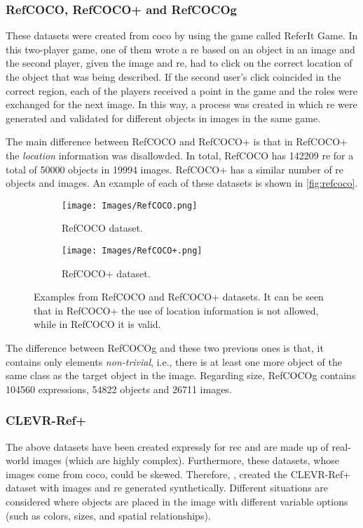 \subsubsection{RefCOCO, RefCOCO+ and RefCOCOg}
These datasets were created from \gls{coco} by 
using the game called ReferIt Game. In this two-player game, one of them wrote
a \gls{re} based on an object in an image and the second player, given the
image and \gls{re}, had to click on the correct location of the object that was
being described. If the second user's click coincided in the correct region,
each of the players received a point in the game and the roles were exchanged
for the next image. In this way, a process was created in which \gls{re} were
generated and validated for different objects in images in the same game.

The main difference between RefCOCO and RefCOCO+ is that in RefCOCO+ the
\emph{location} information was disallowded. In total, RefCOCO has \num{142209}
\gls{re} for a total of \num{50000} objects in \num{19994} images. RefCOCO+ has
a similar number of \gls{re} objects and images. An example of each of these
datasets is shown in \vref{fig:refcoco}.

\begin{figure}[ht]
  \centering
  \begin{subfigure}[t]{.45\textwidth}
    \centering
    \caption{RefCOCO dataset.}
    \texttt{[image: Images/RefCOCO.png]}
  \end{subfigure}
  \begin{subfigure}[t]{.45\textwidth}
    \centering
    \caption{RefCOCO+ dataset.}
    \texttt{[image: Images/RefCOCO+.png]}
  \end{subfigure}
  \caption[Examples from RefCOCO and RefCOCO+ datasets]{Examples from RefCOCO
    and RefCOCO+ datasets. It can be seen that in RefCOCO+ the use of location
    information is not allowed, while in RefCOCO it is valid.}
  \label{fig:refcoco}
\end{figure}

The difference between RefCOCOg and these two previous ones is that, it
contains only elements \emph{non-trivial}, i.e., there is at least one more
object of the same class as the target object in the image. Regarding size,
RefCOCOg contains \num{104560} expressions, \num{54822} objects and \num{26711}
images.

\subsubsection{CLEVR-Ref+}
The above datasets have been created expressly for \gls{rec} and are made up of
real-world images (which are highly complex). Furthermore, these datasets,
whose images come from \gls{coco}, could be skewed. Therefore,
, created the CLEVR-Ref+ dataset with images and \gls{re}
generated synthetically. Different situations are considered where objects are
placed in the image with different variable options (such as colors, sizes, and
spatial relationships).

